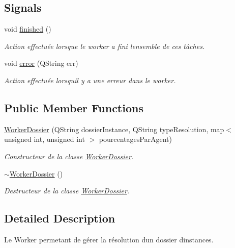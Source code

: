 \subsection*{Signals}
\begin{DoxyCompactItemize}
\item 
void \hyperlink{classWorkerDossier_aef696bfd03c464295dc80fb1fc9f71da}{finished} ()
\begin{DoxyCompactList}\small\item\em Action effectuée lorsque le worker a fini l\textquotesingle{}ensemble de ces tâches. \end{DoxyCompactList}\item 
void \hyperlink{classWorkerDossier_afb02d04b47bb81450661cbc36ad25902}{error} (Q\+String err)
\begin{DoxyCompactList}\small\item\em Action effectuée lorsqu\textquotesingle{}il y a une erreur dans le worker. \end{DoxyCompactList}\end{DoxyCompactItemize}
\subsection*{Public Member Functions}
\begin{DoxyCompactItemize}
\item 
\hyperlink{classWorkerDossier_a72e98152d70e4c7bdbc0d0c138ba992a}{Worker\+Dossier} (Q\+String dossier\+Instance, Q\+String type\+Resolution, map$<$ unsigned int, unsigned int $>$ pourcentages\+Par\+Agent)
\begin{DoxyCompactList}\small\item\em Constructeur de la classe \hyperlink{classWorkerDossier}{Worker\+Dossier}. \end{DoxyCompactList}\item 
\hyperlink{classWorkerDossier_ac2d339dcdd7e35d1fed6debf3495f904}{$\sim$\+Worker\+Dossier} ()
\begin{DoxyCompactList}\small\item\em Destructeur de la classe \hyperlink{classWorkerDossier}{Worker\+Dossier}. \end{DoxyCompactList}\end{DoxyCompactItemize}


\subsection{Detailed Description}
Le Worker permetant de gérer la résolution d\textquotesingle{}un dossier d\textquotesingle{}instances. 

